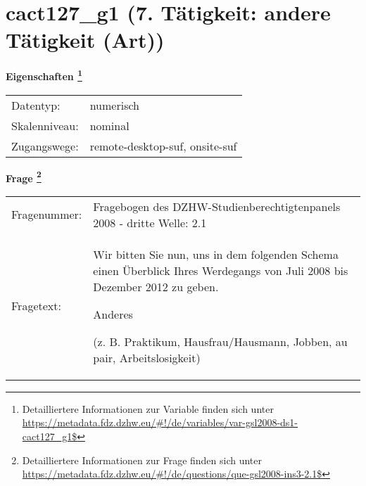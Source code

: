 
    \setcounter{footnote}{0}

    \vspace*{-1.8cm}
	\section{cact127\_g1 (7. Tätigkeit: andere Tätigkeit (Art))}
	\label{section:cact127_g1}



    \vspace*{0.5cm}
    \noindent\textbf{Eigenschaften
	\footnote{Detailliertere Informationen zur Variable finden sich unter
		\url{https://metadata.fdz.dzhw.eu/\#!/de/variables/var-gsl2008-ds1-cact127_g1$}}}\\
	\begin{tabularx}{\hsize}{@{}lX}
	Datentyp: & numerisch \\
	Skalenniveau: & nominal \\
	Zugangswege: &
	  remote-desktop-suf, 
	  onsite-suf
 \\
    \end{tabularx}



				\vspace*{0.5cm}
                \noindent\textbf{Frage
	                \footnote{Detailliertere Informationen zur Frage finden sich unter
		              \url{https://metadata.fdz.dzhw.eu/\#!/de/questions/que-gsl2008-ins3-2.1$}}}\\
				\begin{tabularx}{\hsize}{@{}lX}
					Fragenummer: &
					  Fragebogen des DZHW-Studienberechtigtenpanels 2008 - dritte Welle:
					  2.1
 \\
					Fragetext: & Wir bitten Sie nun, uns in dem folgenden Schema einen Überblick Ihres Werdegangs von Juli 2008 bis Dezember 2012 zu geben.\par  Anderes\par  (z. B. Praktikum, Hausfrau/Hausmann, Jobben, au pair, Arbeitslosigkeit) \\
				\end{tabularx}





